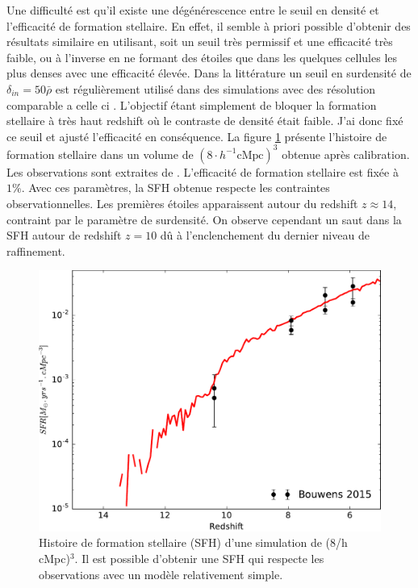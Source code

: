 Une difficulté est qu'il existe une dégénérescence entre le seuil en densité et l'efficacité de formation stellaire.
En effet, il semble à priori possible d'obtenir des résultats similaire en utilisant, soit un seuil très permissif et une efficacité très faible, ou à l'inverse en ne formant des étoiles que dans les quelques cellules les plus denses avec une efficacité élevée.
Dans la littérature un seuil en surdensité de $\delta_{in}=50\bar{\rho}$ est régulièrement utilisé dans des simulations avec des résolution comparable a celle ci \citep{ocvirk_cosmic_2015,stinson_star_2006}.
L'objectif étant simplement de bloquer la formation stellaire à très haut redshift où le contraste de densité était faible.
J'ai donc fixé ce seuil et ajusté l'efficacité en conséquence.
La figure \ref{fig:test_SFH} présente l'histoire de formation stellaire dans un volume de $\left( 8\cdot h^{-1} \mathrm{cMpc} \right)^3$ obtenue après calibration. 
Les observations sont extraites de \cite{bouwens_reionization_2015}.
L'efficacité de formation stellaire est fixée à $1\%$.
Avec ces paramètres, la \ac{SFH} obtenue respecte les contraintes observationnelles.
Les premières étoiles apparaissent autour du redshift $z\approx 14$, contraint par le paramètre de surdensité.
On observe cependant un saut dans la \ac{SFH} autour de redshift $z=10$ dû à l'enclenchement du dernier niveau de raffinement.

\begin{figure}
        \includegraphics[width=.95\linewidth]{img/02/SFR.pdf}
        \caption[Histoire de formation stellaire]{Histoire de formation stellaire (SFH) d'une simulation de (8/h cMpc)$^3$.
        Il est possible d'obtenir une SFH qui respecte les observations avec un modèle relativement simple.
}
 		\label{fig:test_SFH}
\end{figure}

